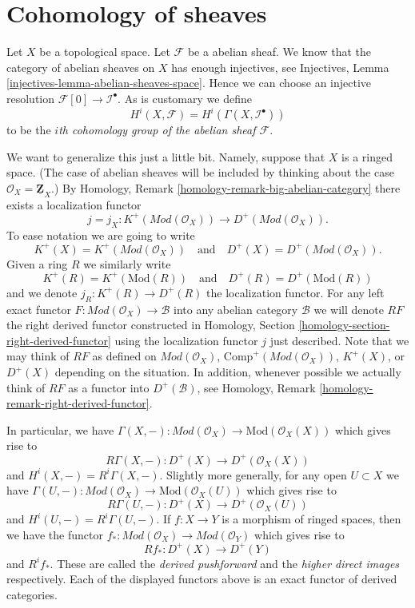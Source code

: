 \section{Cohomology of sheaves}
\label{section-cohomology-sheaves}

\noindent
Let $X$ be a topological space.
Let $\mathcal{F}$ be a abelian sheaf.
We know that the category of abelian sheaves on $X$ has enough injectives,
see Injectives, Lemma \ref{injectives-lemma-abelian-sheaves-space}.
Hence we can choose an injective resolution
$\mathcal{F}[0] \to \mathcal{I}^\bullet$.
As is customary we define
$$
H^i(X, \mathcal{F}) = H^i(\Gamma(X, \mathcal{I}^\bullet))
$$
to be the {\it $i$th cohomology group of the abelian sheaf $\mathcal{F}$}.

\medskip\noindent
We want to generalize this just a little bit. Namely, suppose that $X$
is a ringed space. (The case of abelian sheaves will be included
by thinking about the case $\mathcal{O}_X = \underline{\mathbf{Z}}_X$.)
By Homology, Remark \ref{homology-remark-big-abelian-category} there exists a
localization functor
$$
j = j_X : K^{+}(\textit{Mod}(\mathcal{O}_X))
\longrightarrow
D^{+}(\textit{Mod}(\mathcal{O}_X)).
$$
To ease notation we are going to write
$$
K^{+}(X) = K^{+}(\textit{Mod}(\mathcal{O}_X))
\quad
\text{and}
\quad
D^{+}(X) = D^{+}(\textit{Mod}(\mathcal{O}_X)).
$$
Given a ring $R$ we similarly write
$$
K^{+}(R) = K^{+}(\text{Mod}(R))
\quad
\text{and}
\quad
D^{+}(R) = D^{+}(\text{Mod}(R))
$$
and we denote $j_R : K^{+}(R) \to D^{+}(R)$ the localization functor.
For any left exact functor $F : \textit{Mod}(\mathcal{O}_X) \to \mathcal{B}$
into any abelian category $\mathcal{B}$ we will denote $RF$ the
right derived functor constructed in
Homology, Section \ref{homology-section-right-derived-functor}
using the localization functor $j$ just described.
Note that we may think of $RF$ as defined on $\textit{Mod}(\mathcal{O}_X)$,
$\text{Comp}^{+}(\textit{Mod}(\mathcal{O}_X))$,
$K^{+}(X)$, or $D^{+}(X)$
depending on the situation. In addition, whenever possible
we actually think of $RF$ as a functor into $D^{+}(\mathcal{B})$, see
Homology, Remark \ref{homology-remark-right-derived-functor}.

\medskip\noindent
In particular, we have
$
\Gamma(X, -) :
\textit{Mod}(\mathcal{O}_X)
\longrightarrow
\text{Mod}(\mathcal{O}_X(X))
$
which gives rise to
$$
R\Gamma(X, -) :
D^{+}(X)
\longrightarrow
D^{+}(\mathcal{O}_X(X))
$$
and $H^i(X, -) = R^i\Gamma(X, -)$. Slightly more generally, for any open
$U \subset X$ we have
$
\Gamma(U, -) :
\textit{Mod}(\mathcal{O}_X)
\longrightarrow
\text{Mod}(\mathcal{O}_X(U))
$
which gives rise to
$$
R\Gamma(U, -) :
D^{+}(X)
\longrightarrow
D^{+}(\mathcal{O}_X(U))
$$
and $H^i(U, -) = R^i\Gamma(U, -)$.
If $f : X \to Y$ is a morphism of ringed spaces, then we have
the functor
$
f_* :
\textit{Mod}(\mathcal{O}_X)
\longrightarrow
\textit{Mod}(\mathcal{O}_Y)
$
which gives rise to
$$
Rf_* :
D^{+}(X)
\longrightarrow
D^{+}(Y)
$$
and $R^if_*$. These are called the
{\it derived pushforward} and the {\it higher direct images} respectively.
Each of the displayed functors above is an exact functor
of derived categories.

